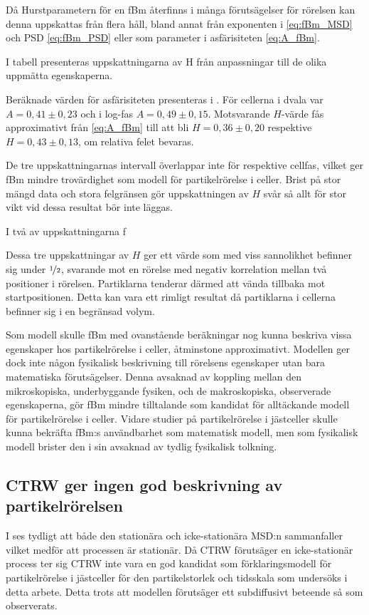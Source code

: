 Då Hurstparametern för en fBm återfinns i många förutsägelser för rörelsen kan denna uppskattas från flera håll, bland annat från exponenten i \eqref{eq:fBm_MSD} och PSD \eqref{eq:fBm_PSD} eller som parameter i asfärisiteten \eqref{eq:A_fBm}. 

I tabell  presenteras uppskattningarna av H från anpassningar till de olika uppmätta egenskaperna.



Beräknade värden för asfärisiteten presenteras i . För cellerna i dvala var $A=0,41\pm 0,23$ och i log-fas $A=0,49\pm 0,15$. Motsvarande $H$-värde fås approximativt från \eqref{eq:A_fBm} till att bli $H=0,36\pm0,20$ respektive $H=0,43\pm0,13$, om relativa felet bevaras. 


De tre uppskattningarnas intervall överlappar inte för respektive cellfas, vilket ger fBm mindre trovärdighet som modell för partikelrörelse i celler. Brist på stor mängd data och stora felgränsen gör uppskattningen av $H$ svår så allt för stor vikt vid dessa resultat bör inte läggas.

I två av uppskattningarna f

Dessa tre uppskattningar av $H$ ger ett värde som med viss sannolikhet befinner sig under $\nicefrac{1}{2}$, svarande mot en rörelse med negativ korrelation mellan två positioner i rörelsen. Partiklarna tenderar därmed att vända tillbaka mot startpositionen. Detta kan vara ett rimligt resultat då partiklarna i cellerna befinner sig i en begränsad volym.

Som modell skulle fBm med ovanstående beräkningar nog kunna beskriva vissa egenskaper hos partikelrörelse i celler, åtminstone approximativt. Modellen ger dock inte någon fysikalisk beskrivning till rörelsens egenskaper utan bara matematiska förutsägelser. Denna avsaknad av koppling mellan den mikroskopiska, underbyggande fysiken, och de makroskopiska, observerade egenskaperna, gör fBm mindre tilltalande som kandidat för alltäckande modell för partikelrörelse i celler. Vidare studier på partikelrörelse i jästceller skulle kunna bekräfta fBm:s användbarhet som matematisk modell, men som fysikalisk modell brister den i sin avsaknad av tydlig fysikalisk tolkning.


\subsection{CTRW ger ingen god beskrivning av partikelrörelsen}
I  ses tydligt att både den stationära och icke-stationära MSD:n sammanfaller vilket medför att processen är stationär. Då CTRW förutsäger en icke-stationär process ter sig CTRW inte vara en god kandidat som förklaringsmodell för partikelrörelse i jästceller för den partikelstorlek och tidsskala som undersöks i detta arbete. Detta trots att modellen förutsäger ett subdiffusivt beteende så som observerats.



